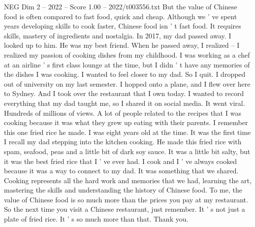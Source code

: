 \begin{textsample}{NEG Dim 2 – 2022 – Score 1.00 – 2022/t003556.txt}
But the value of Chinese food is often compared to fast food, quick and cheap.
Although we ' ve spent years developing skills to cook faster, Chinese food isn ' t fast food.
It requires skills, mastery of ingredients and nostalgia.
In 2017, my dad passed away.
I looked up to him.
He was my best friend.
When he passed away, I realized -- I realized my passion of cooking dishes from my childhood.
I was working as a chef at an airline ' s first class lounge at the time, but I didn ' t have any memories of the dishes I was cooking.
I wanted to feel closer to my dad.
So I quit.
I dropped out of university on my last semester.
I hopped onto a plane, and I flew over here to Sydney.
And I took over the restaurant that I own today.
I wanted to record everything that my dad taught me, so I shared it on social media.
It went viral.
Hundreds of millions of views.
A lot of people related to the recipes that I was cooking because it was what they grew up eating with their parents.
I remember this one fried rice he made.
I was eight years old at the time.
It was the first time I recall my dad stepping into the kitchen cooking.
He made this fried rice with spam, seafood, peas and a little bit of dark soy sauce.
It was a little bit salty, but it was the best fried rice that I ' ve ever had.
I cook and I ' ve always cooked because it was a way to connect to my dad.
It was something that we shared.
Cooking represents all the hard work and memories that we had, learning the art, mastering the skills and understanding the history of Chinese food.
To me, the value of Chinese food is so much more than the prices you pay at my restaurant.
So the next time you visit a Chinese restaurant, just remember.
It ' s not just a plate of fried rice.
It ' s so much more than that.
Thank you.

\end{textsample}
